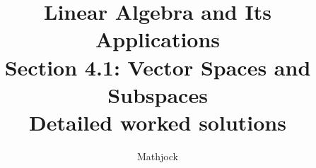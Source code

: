 
\title{\textbf{Linear Algebra and Its Applications}\\[0.3em]Section 4.1: Vector Spaces and Subspaces\\[0.3em]\large Detailed worked solutions}
\author{Mathjock}
\date{}

\maketitle
\bookinfo
\tableofcontents
\clearpage
\renewcommand{\thesection}{4.\arabic{section}}
\renewcommand{\theHsection}{4.\arabic{section}}
\setcounter{section}{0}


